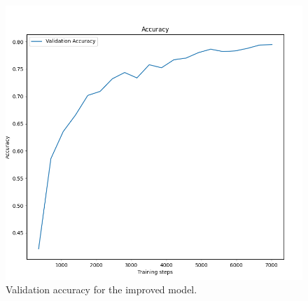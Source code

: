 \documentclass{article}
\begin{document}
\begin{table}[H]
\centering
\caption{Training parameters used when training the improved network.}
\label{tab:netimprovedtrainparam}
\end{table}

\begin{table}[H]
\centering
\caption{Final train loss, final train accuracy, final validation accuracy and average test accuracy for the improved network}
\label{tab:3e_results}
\end{table}

\begin{figure}[H]
    \centering
    \includegraphics[width = \textwidth]{Assignments/Assignment_3/plots/task3e_plot.png}
    \caption{Validation accuracy for the improved model.}
    \label{fig:valaccimproved}
\end{figure}
\end{document}
